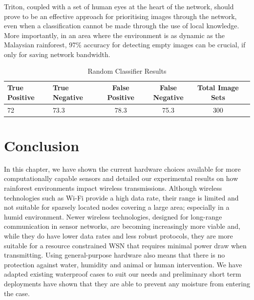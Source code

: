 		Triton, coupled with a set of human eyes at the heart of the network, should prove to be an effective approach for prioritising images through the network, even when a classification cannot be made through the use of local knowledge. More importantly, in an area where the environment is as dynamic as the Malaysian rainforest, 97\% accuracy for detecting empty images can be crucial, if only for saving network bandwidth.
		
		\begin{table}
			\hfill{}
			\begin{tabular}{|l|l|c|c|c|c|}
				\hline
					True Positive & True Negative & False Positive  & False Negative & Total Image Sets \\
				\hline
					72 & 73.3 & 78.3 & 75.3 & 300 \\
				\hline
			\end{tabular}
			\hfill{}
			\caption{Random Classifier Results}
			\label{table:random}
		\end{table}			
%	

\section{Conclusion}\label{tech:conc}
	In this chapter, we have shown the current hardware choices available for more computationally capable sensors and detailed our experimental results on how rainforest environments impact wireless transmissions. Although wireless technologies such as Wi-Fi provide a high data rate, their range is limited and not suitable for sparsely located nodes covering a large area; especially in a humid environment.
	Newer wireless technologies, designed for long-range communication in sensor networks, are becoming increasingly more viable and, while they do have lower data rates and less robust protocols, they are more suitable for a resource constrained WSN that requires minimal power draw when transmitting. 
	Using general-purpose hardware also means that there is no protection against water, humidity and animal or human intervention. We have adapted existing waterproof cases to suit our needs and preliminary short term deployments have shown that they are able to prevent any moisture from entering the case.
	 